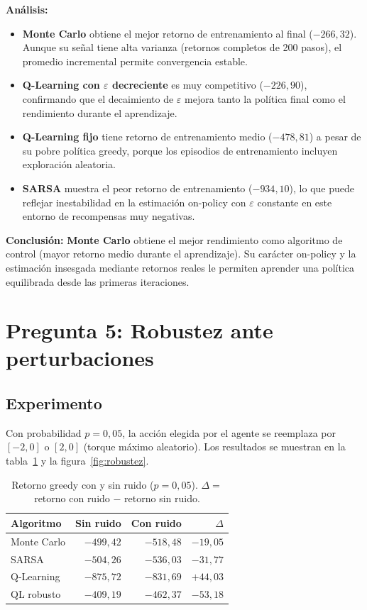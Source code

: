 \documentclass[12pt,a4paper]{article}
\begin{document}
\textbf{Análisis:}

\begin{itemize}
  \item \textbf{Monte Carlo} obtiene el mejor retorno de entrenamiento al final
        ($-266{,}32$). Aunque su señal tiene alta varianza (retornos completos de
        200 pasos), el promedio incremental permite convergencia estable.
  \item \textbf{Q-Learning con $\varepsilon$ decreciente} es muy competitivo
        ($-226{,}90$), confirmando que el decaimiento de $\varepsilon$ mejora
        tanto la política final como el rendimiento durante el aprendizaje.
  \item \textbf{Q-Learning fijo} tiene retorno de entrenamiento medio
        ($-478{,}81$) a pesar de su pobre política greedy, porque los episodios
        de entrenamiento incluyen exploración aleatoria.
  \item \textbf{SARSA} muestra el peor retorno de entrenamiento ($-934{,}10$),
        lo que puede reflejar inestabilidad en la estimación on-policy con
        $\varepsilon$ constante en este entorno de recompensas muy negativas.
\end{itemize}

\textbf{Conclusión:} \textbf{Monte Carlo} obtiene el mejor rendimiento como
algoritmo de control (mayor retorno medio durante el aprendizaje). Su carácter
on-policy y la estimación insesgada mediante retornos reales le permiten aprender
una política equilibrada desde las primeras iteraciones.

\section{Pregunta 5: Robustez ante perturbaciones}

\subsection{Experimento}

Con probabilidad $p=0{,}05$, la acción elegida por el agente se reemplaza por
$[-2{,}0]$ o $[2{,}0]$ (torque máximo aleatorio). Los resultados se muestran en la
tabla~\ref{tab:ruido} y la figura~\ref{fig:robustez}.

\begin{table}[H]
  \centering
  \caption{Retorno greedy con y sin ruido ($p=0{,}05$).
           $\Delta=$ retorno con ruido $-$ retorno sin ruido.}
  \label{tab:ruido}
  \begin{tabular}{lrrr}
    \toprule
    Algoritmo & Sin ruido & Con ruido & $\Delta$ \\
    \midrule
    Monte Carlo   & $-499{,}42$ & $-518{,}48$ & $-19{,}05$ \\
    SARSA         & $-504{,}26$ & $-536{,}03$ & $-31{,}77$ \\
    Q-Learning    & $-875{,}72$ & $-831{,}69$ & $+44{,}03$ \\
    QL robusto    & $-409{,}19$ & $-462{,}37$ & $-53{,}18$ \\
    \bottomrule
  \end{tabular}
\end{table}
\end{document}
